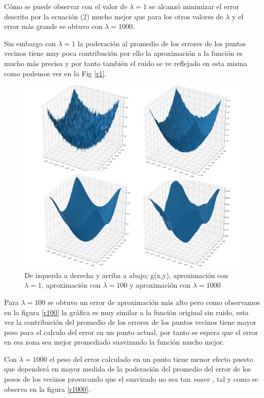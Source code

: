 \documentclass[conference]{IEEEtran}
\begin{document}
Cómo se puede observar con el valor de $\lambda=1$ se alcanzó minimizar el error descrito por
la ecuación (2) mucho mejor que para los otros valores de $\lambda$ y el error más grande se obtuvo
con $\lambda=1000$.

Sin embargo con $\lambda=1$ la poderación al promedio de los errores de los
puntos vecinos tiene muy poca contribución por ello la aproximación a la función es mucho más
precisa y por tanto también el ruido se ve reflejado en esta misma como podemos ver en la Fig
\ref{r1}.

\begin{figure}[htbp]
    \centerline{\includegraphics[scale=0.3]{ra.png}}
    \caption{De izquerda a derecha y arriba a abajo; g(x,y), aproximación con $\lambda=1$, aproximación con $\lambda=100$ y aproximación con $\lambda=1000$}
    \label{ra}
\end{figure}

Para $\lambda=100$ se obtuvo un error de aproximación más alto pero como observamos en la figura
\ref{r100} la gráfica es muy similar a la función original sin ruido, esta vez la contribución del
promedio de los errores de los puntos vecinos tiene mayor peso para el calculo del error en un punto
actual, por tanto se espera que el error en esa zona sea mejor promediado suavizando la función
mucho mejor.

Con $\lambda=1000$ el peso del error calculado en un punto tiene menor efecto puesto que dependerá
en mayor medida de la poderación del promedio del error de los pesos de los vecinos provacando que
el suavizado no sea tan \textit{suave} , tal y como se observa en la figura \ref{r1000}.
\end{document}
